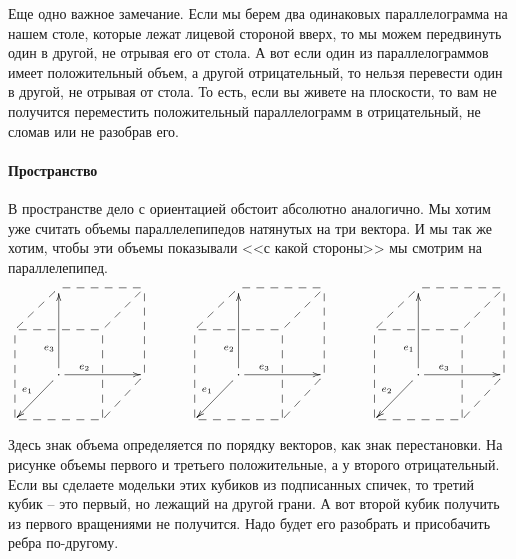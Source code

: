Еще одно важное замечание.
Если мы берем два одинаковых параллелограмма на нашем столе, которые лежат лицевой стороной вверх, то мы можем передвинуть один в другой, не отрывая его от стола.
А вот если один из параллелограммов имеет положительный объем, а другой отрицательный, то нельзя перевести один в другой, не отрывая от стола.
То есть, если вы живете на плоскости, то вам не получится переместить положительный параллелограмм в отрицательный, не сломав или не разобрав его.

\paragraph{Пространство}

В пространстве дело с ориентацией обстоит абсолютно аналогично.
Мы хотим уже считать объемы параллелепипедов натянутых на три вектора.
И мы так же хотим, чтобы эти объемы показывали <<с какой стороны>> мы смотрим на параллелепипед.
\[
\xymatrix{
	{}&{}\ar@{--}[rr]\ar@{--}[dl]&{}&{}\ar@{--}[dl]\\
	{}\ar@{--}[rr]&{}&{}&{}\\
	{}&{\cdot}\ar[uu]^(.3){e_3}\ar[rr]^(.3){e_2}\ar[dl]_{e_1}&{}&{}\ar@{--}[dl]\ar@{--}[uu]\\
	{}\ar@{--}[rr]\ar@{--}[uu]&{}&{}\ar@{--}[uu]&{}\\
}
\quad\quad\quad
\xymatrix{
	{}&{}\ar@{--}[rr]\ar@{--}[dl]&{}&{}\ar@{--}[dl]\\
	{}\ar@{--}[rr]&{}&{}&{}\\
	{}&{\cdot}\ar[uu]^(.3){e_2}\ar[rr]^(.3){e_3}\ar[dl]_{e_1}&{}&{}\ar@{--}[dl]\ar@{--}[uu]\\
	{}\ar@{--}[rr]\ar@{--}[uu]&{}&{}\ar@{--}[uu]&{}\\
}
\quad\quad\quad
\xymatrix{
	{}&{}\ar@{--}[rr]\ar@{--}[dl]&{}&{}\ar@{--}[dl]\\
	{}\ar@{--}[rr]&{}&{}&{}\\
	{}&{\cdot}\ar[uu]^(.3){e_1}\ar[rr]^(.3){e_3}\ar[dl]_{e_2}&{}&{}\ar@{--}[dl]\ar@{--}[uu]\\
	{}\ar@{--}[rr]\ar@{--}[uu]&{}&{}\ar@{--}[uu]&{}\\
}
\]
Здесь знак объема определяется по порядку векторов, как знак перестановки.
На рисунке объемы первого и третьего положительные, а у второго отрицательный.
Если вы сделаете модельки этих кубиков из подписанных спичек, то третий кубик -- это первый, но лежащий на другой грани.
А вот второй кубик получить из первого вращениями не получится.
Надо будет его разобрать и присобачить ребра по-другому.

